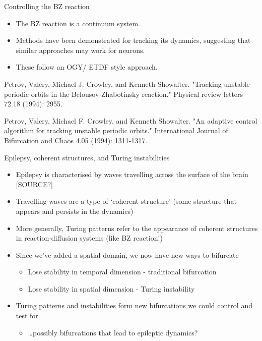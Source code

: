 \documentclass[presentation]{beamer}
\begin{document}
\begin{frame}[label={sec:org4182f6d}]{Controlling the BZ reaction}
\begin{itemize}
\item The BZ reaction is a continuum system.
\item Methods have been demonstrated for tracking its dynamics, suggesting that similar approaches may work for neurons.
\item These follow an OGY/ ETDF style approach.
\end{itemize}

Petrov, Valery, Michael J. Crowley, and Kenneth Showalter. "Tracking unstable periodic orbits in the Belousov-Zhabotinsky reaction." Physical review letters 72.18 (1994): 2955.

Petrov, Valery, Michael F. Crowley, and Kenneth Showalter. "An adaptive control algorithm for tracking unstable periodic orbits." International Journal of Bifurcation and Chaos 4.05 (1994): 1311-1317.
\end{frame}

\begin{frame}[label={sec:orgb251ebe}]{Epilepsy, coherent structures, and Turing instabilities}
\begin{itemize}
\item Epilepsy is characterised by waves travelling across the surface of the brain [SOURCE?]
\item Travelling waves are a type of `coherent structure' (some structure that appears and persists in the dynamics)
\item More generally, Turing patterns refer to the appearance of coherent structures in reaction-diffusion systems (like BZ reaction!)
\item Since we've added a spatial domain, we now have new ways to bifurcate
\begin{itemize}
\item Lose stability in temporal dimension - traditional bifurcation
\item Lose stability in spatial dimension - Turing instability
\end{itemize}
\item Turing patterns and instabilities form new bifurcations we could control and test for
\begin{itemize}
\item \ldots{}possibly bifurcations that lead to epileptic dynamics?
\end{itemize}
\end{itemize}
\end{frame}
\end{document}
